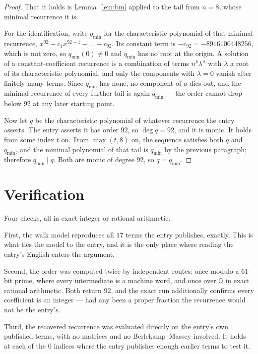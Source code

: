 \documentclass[11pt,a4paper]{article}
\theoremstyle{plain}
\theoremstyle{definition}
\begin{document}
\begin{proof}
That it holds is Lemma~\ref{lem:bm} applied to the tail from $n=8$, whose minimal
recurrence it is.

For the identification, write $q_{\min}$ for the characteristic polynomial of that minimal
recurrence, $x^{92}-c_1x^{92-1}-\dots-c_{92}$. Its constant term is
$-c_{92}=-8916100448256$, which is not zero, so $q_{\min}(0)\neq0$ and $q_{\min}$ has no
root at the origin. A solution of a constant-coefficient recurrence is a combination of terms
$n^{k}\lambda^{n}$ with $\lambda$ a root of its characteristic polynomial, and only the
components with $\lambda=0$ vanish after finitely many terms. Since $q_{\min}$ has none, no
component of $a$ dies out, and the minimal recurrence of every further tail is again
$q_{\min}$ --- the order cannot drop below $92$ at any later starting point.

Now let $q$ be the characteristic polynomial of whatever recurrence the entry asserts. The
entry asserts it has order $92$, so $\deg q=92$, and it is monic. It holds from some
index $t$ on. From $\max(t,8)$ on, the sequence satisfies both $q$ and $q_{\min}$, and
the minimal polynomial of that tail is $q_{\min}$ by the previous paragraph; therefore
$q_{\min}\mid q$. Both are monic of degree $92$, so $q=q_{\min}$.
\end{proof}

\section{Verification}

Four checks, all in exact integer or rational arithmetic.

First, the walk model reproduces all $17$ terms the entry publishes, exactly. This is
what ties the model to the entry, and it is the only place where reading the entry's English
enters the argument.

Second, the order was computed twice by independent routes: once modulo a $61$-bit prime, where
every intermediate is a machine word, and once over $\mathbb{Q}$ in exact rational arithmetic.
Both return $92$, and the exact run additionally confirms every coefficient is an integer
--- had any been a proper fraction the recurrence would not be the entry's.

Third, the recovered recurrence was evaluated directly on the entry's own published terms, with
no matrices and no Berlekamp--Massey involved. It holds at each of the $0$ indices where
the entry publishes enough earlier terms to test it.
\end{document}
